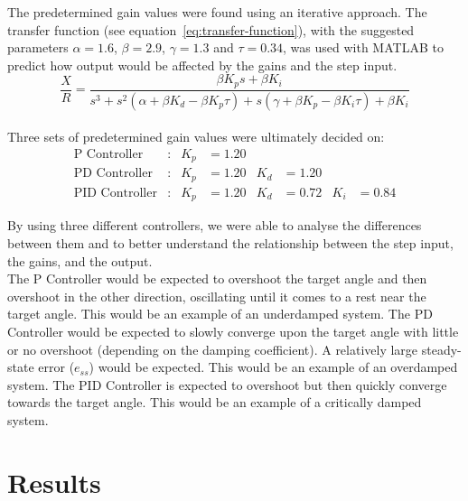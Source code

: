 \documentclass[12pt]{article} %
\begin{document}
\noindent The predetermined gain values were found using an iterative approach. The transfer function (see equation\ \ref{eq:transfer-function}), with the suggested parameters $\alpha = 1.6$, $\beta = 2.9$, $\gamma = 1.3$ and $\tau = 0.34$, was used with MATLAB to predict how output would be affected by the gains and the step input.
\\ 

\begin{equation}
\label{eq:transfer-function}
\frac{X}{R} = \frac{\beta K_p s + \beta K_i}{s^3 + s^2 (\alpha + \beta K_d - \beta K_p \tau) + s(\gamma + \beta K_p - \beta K_i \tau) + \beta K_i}
\end{equation}
\\ 

\noindent Three sets of predetermined gain values were ultimately decided on:
\begin{align*}
\textrm{P Controller} &: & K_p &= 1.20 & & & \\[1em]
\textrm{PD Controller} &: & K_p &= 1.20 & K_d &= 1.20 & & \\[1em]
\textrm{PID Controller} &: & K_p &= 1.20 & K_d &= 0.72 & K_i &= 0.84
\end{align*}

\noindent By using three different controllers, we were able to analyse the differences between them and to better understand the relationship between the step input, the gains, and the output.
\\ 

\noindent The P Controller would be expected to overshoot the target angle and then overshoot in the other direction, oscillating until it comes to a rest near the target angle. This would be an example of an underdamped system.
The PD Controller would be expected to slowly converge upon the target angle with little or no overshoot (depending on the damping coefficient). A relatively large steady-state error ($e_{ss}$) would be expected. This would be an example of an overdamped system.
The PID Controller is expected to overshoot but then quickly converge towards the target angle. This would be an example of a critically damped system.

\section{Results}

\end{document}
